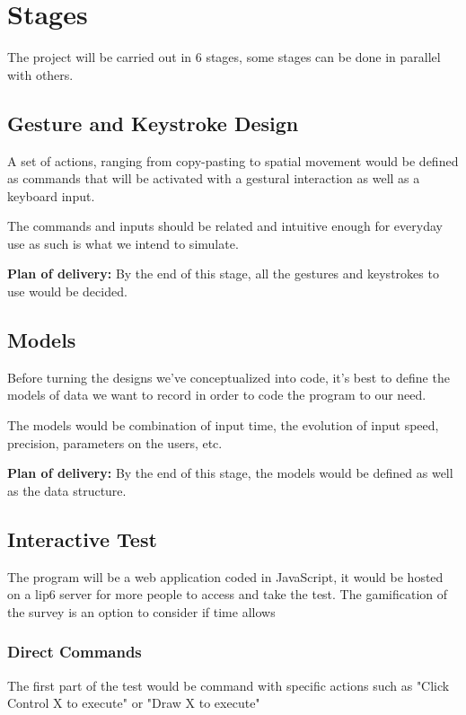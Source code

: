 \documentclass[12pt]{article}
\begin{document}
\section{Stages}

The project will be carried out in 6 stages, some stages can be done in parallel with others.

\subsection{Gesture and Keystroke Design}
A set of actions, ranging from copy-pasting to spatial movement would be defined as commands that will be activated with a gestural interaction as well as a keyboard input. 

The commands and inputs should be related and intuitive enough for everyday use as such is what we intend to simulate.

\textbf{Plan of delivery: }By the end of this stage, all the gestures and keystrokes to use would be decided.

\subsection{Models}
Before turning the designs we've conceptualized into code, it's best to define the models of data we want to record in order to code the program to our need.

The models would be combination of input time, the evolution of input speed, precision, parameters on the users, etc.

\textbf{Plan of delivery: }By the end of this stage, the models would be defined as well as the data structure.

\subsection{Interactive Test}
The program will be a web application coded in JavaScript, it would be hosted on a lip6 server for more people to access and take the test. The gamification of the survey is an option to consider if time allows

\subsubsection{Direct Commands}
The first part of the test would be command with specific actions such as "Click Control X to execute" or "Draw X to execute"
\end{document}
